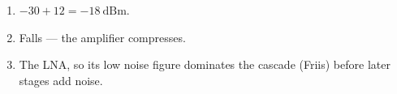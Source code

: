 \begin{enumerate}[leftmargin=1.6em,itemsep=2pt]
\item $-30 + 12 = -18\ \text{dBm}$.
\item Falls --- the amplifier compresses.
\item The LNA, so its low noise figure dominates the cascade (Friis) before later stages add noise.
\end{enumerate}
